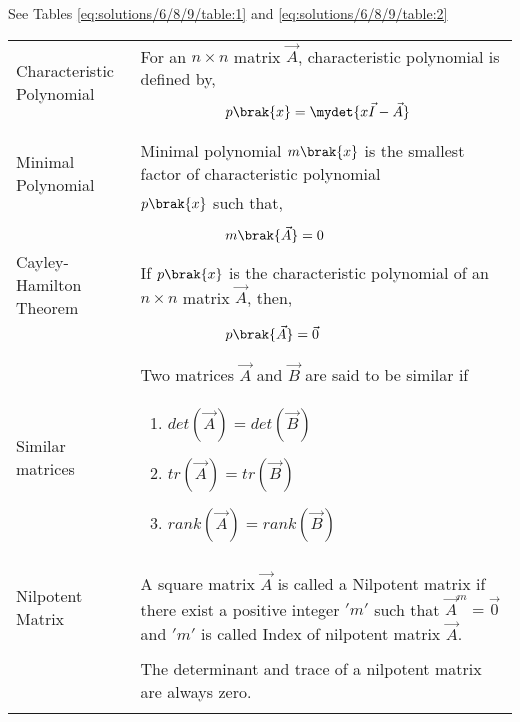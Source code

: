 See Tables     \ref{eq:solutions/6/8/9/table:1}
and     \ref{eq:solutions/6/8/9/table:2}

\begin{table*}[ht!]
\centering
\begin{tabular}{|p{5cm}|p{13cm}|}
    \hline
	\multirow{3}{*}{Characteristic Polynomial} 
	& For an $n\times n$ matrix $\vec{A}$, characteristic polynomial is defined by,\\
	&\\
	& $\qquad\qquad\qquad p\brak{x}=\mydet{x\Vec{I}-\Vec{A}}$\\
	&\\
	\hline
	\multirow{3}{*}{Minimal Polynomial} 
	&\\
	& Minimal polynomial $m\brak{x}$ is the smallest factor of characteristic polynomial\\
	& $p\brak{x}$ such that,\\
	&\\
	& $\qquad \qquad \qquad m\brak{\vec{A}}=0$\\
    \hline
    \multirow{3}{*}{Cayley-Hamilton Theorem}
    &\\
    & If $p\brak{x}$ is the characteristic polynomial of an $n\times n$ matrix $\vec{A}$, then,\\
    &\\
    &$\qquad \qquad \qquad p\brak{\vec{A}}=\vec{0}$\\
    &\\
    \hline
    \multirow{3}{*}{Similar matrices}&\\
    &  Two   matrices $\vec{A}$ and $\vec{B}$ are said to be similar if\\
    &{\begin{enumerate}
        \item $det(\vec{A}) = det(\vec{B})$
        
        \item $tr (\vec{A}) = tr (\vec{B})$
       
        \item $rank(\vec{A})=rank(\vec{B})$
    \end{enumerate}}\\
    \hline
    \multirow{3}{*}{Nilpotent Matrix}&\\
    & A square matrix $\vec{A}$ is called a Nilpotent matrix if there exist a positive integer $'m'$ such that $\vec{A}^{m}=\vec{0}$ and $'m'$ is called Index of nilpotent matrix $\vec{A}$.\\
    &\\
   & The determinant and trace of a nilpotent matrix are always zero.\\
   &\\
    \hline
    
\end{tabular}
\label{eq:solutions/6/8/9/table:1}
    \caption{Definitions}
\end{table*}
